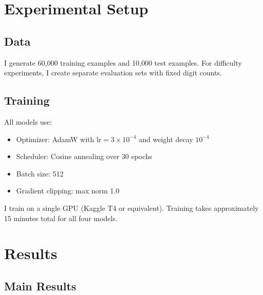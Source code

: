 \documentclass[11pt]{article}
\begin{document}
\section{Experimental Setup}

\subsection{Data}

I generate 60,000 training examples and 10,000 test examples. For difficulty experiments, I create separate evaluation sets with fixed digit counts.

\subsection{Training}

All models use:
\begin{itemize}
    \item Optimizer: AdamW with $\text{lr} = 3 \times 10^{-4}$ and weight decay $10^{-4}$
    \item Scheduler: Cosine annealing over 30 epochs
    \item Batch size: 512
    \item Gradient clipping: max norm 1.0
\end{itemize}

I train on a single GPU (Kaggle T4 or equivalent). Training takes approximately 15 minutes total for all four models.

\section{Results}

\subsection{Main Results}
\end{document}
